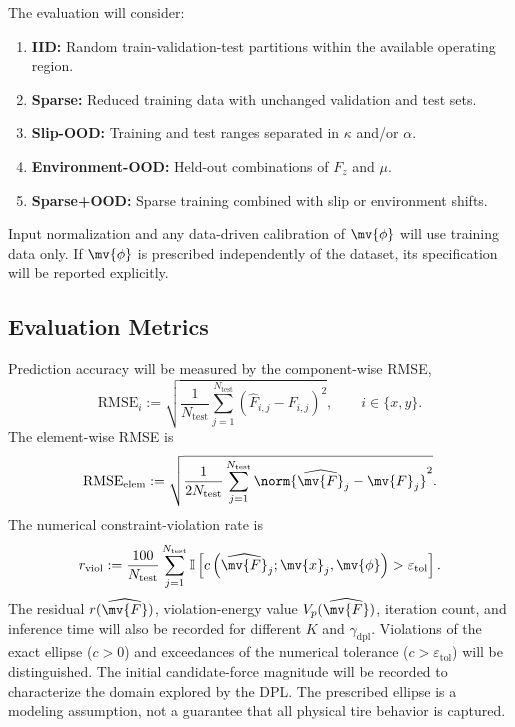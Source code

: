 The evaluation will consider:
\begin{enumerate}
	\item \textbf{IID:} Random train-validation-test partitions within
	      the available operating region.
	\item \textbf{Sparse:} Reduced training data with unchanged validation
	      and test sets.
	\item \textbf{Slip-OOD:} Training and test ranges separated in
	      $\kappa$ and/or $\alpha$.
	\item \textbf{Environment-OOD:} Held-out combinations of $F_z$ and $\mu$.
	\item \textbf{Sparse+OOD:} Sparse training combined with slip
	      or environment shifts.
\end{enumerate}
Input normalization and any data-driven calibration of $\mv{\phi}$
will use training data only. If $\mv{\phi}$ is prescribed independently
of the dataset, its specification will be reported explicitly.

\subsection{Evaluation Metrics}
\label{Tire:sec:metrics}

Prediction accuracy will be measured by the component-wise RMSE,
\begin{equation}
	\label{Tire:eq:rmse}
	\mathrm{RMSE}_i
	:=
	\sqrt{
	\frac{1}{N_{\mathrm{test}}}
	\sum_{j=1}^{N_{\mathrm{test}}}
	\left(
	\widehat{F}_{i,j}
	-
	F_{i,j}
	\right)^2
	}
	,
	\qquad
	i\in\{x,y\}
	.
\end{equation}
The element-wise RMSE is
\begin{equation}
	\label{Tire:eq:rmse:element}
	\mathrm{RMSE}_{\mathrm{elem}}
	:=
	\sqrt{
	\frac{1}{2N_{\mathrm{test}}}
	\sum_{j=1}^{N_{\mathrm{test}}}
	\norm{
		\widehat{\mv{F}}_j
		-
		\mv{F}_j
	}^2
	}
	.
\end{equation}
The numerical constraint-violation rate is
\begin{equation}
	\label{Tire:eq:violation:rate}
	r_{\mathrm{viol}}
	:=
	\frac{100}{N_{\mathrm{test}}}
	\sum_{j=1}^{N_{\mathrm{test}}}
	\mathbb{I}
	\left[
		c
		\left(
		\widehat{\mv{F}}_j;\mv{x}_j,\mv{\phi}
		\right)
		>
		\varepsilon_{\mathrm{tol}}
		\right]
	.
\end{equation}
The residual $r(\widehat{\mv{F}})$, violation-energy value
$V_p(\widehat{\mv{F}})$, iteration count, and inference time will
also be recorded for different $K$ and $\gamma_{\mathrm{dpl}}$.
Violations of the exact ellipse ($c>0$) and exceedances of the numerical
tolerance ($c>\varepsilon_{\mathrm{tol}}$) will be distinguished.
The initial candidate-force magnitude will be recorded to characterize
the domain explored by the DPL. The prescribed ellipse is a modeling
assumption, not a guarantee that all physical tire behavior is captured.

